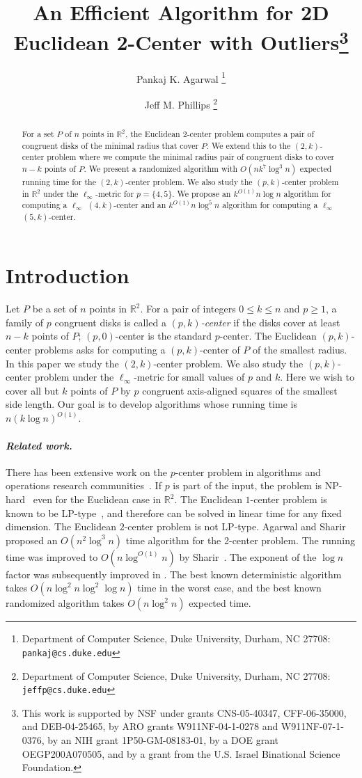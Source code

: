 \documentclass[11pt]{myclass}
\title{An Efficient Algorithm for 2D Euclidean 2-Center with Outliers\thanks{This work is supported by NSF under grants CNS-05-40347, CFF-06-35000, and DEB-04-25465, by ARO grants W911NF-04-1-0278 and W911NF-07-1-0376, by an NIH grant 1P50-GM-08183-01, by a DOE grant OEGP200A070505, and by a grant from the U.S. Israel Binational Science Foundation.}}
\author{Pankaj K. Agarwal
\thanks{Department of Computer Science, Duke University, Durham, NC 27708: \texttt{pankaj@cs.duke.edu}} 
\and Jeff M. Phillips
\thanks{Department of Computer Science, Duke University, Durham, NC 27708: \texttt{jeffp@cs.duke.edu}}
}
\renewcommand{\b}[1]{\ensuremath{\mathbb{#1}}}
\begin{document}
\maketitle

\begin{abstract}
For a set $P$ of $n$ points in $\b{R}^2$, the Euclidean $2$-center problem computes a pair of congruent disks of the minimal radius that cover $P$.  We extend this to the $(2,k)$-center problem where we compute the minimal radius pair of congruent disks to cover $n-k$ points of $P$.  
We present a randomized algorithm with $O(n k^7 \log^3 n)$ expected running time for the $(2,k)$-center problem.  
We also study the $(p,k)$-center problem in $\b{R}^2$ under the $\ell_\infty$-metric for $p=\{4,5\}$. 
We propose an $k^{O(1)} n\log n$ algorithm for computing a $\ell_\infty$ $(4,k)$-center and an $k^{O(1)} n \log^5 n$ algorithm for computing a $\ell_\infty$ $(5,k)$-center. 
\end{abstract}

\section{Introduction}
Let $P$ be a set of $n$ points in $\b{R}^2$.  For a pair of integers $0\leq k \leq n$ and $p \geq 1$, a family of $p$ congruent disks is called a \emph{$(p,k)$-center} if the disks cover at least $n-k$ points of $P$; $(p,0)$-center is the standard $p$-center.  The Euclidean $(p,k)$-center problems asks for computing a $(p,k)$-center of $P$ of the smallest radius.  In this paper we study the $(2,k)$-center problem.
We also study the $(p,k)$-center problem under the $\ell_\infty$-metric for small values of $p$ and $k$.  Here we wish to cover all but $k$ points of $P$ by $p$ congruent axis-aligned squares of the smallest side length.  Our goal is to develop algorithms whose running time is $n (k \log n)^{O(1)}$.


\paragraph{\textbf{\emph{Related work.}}}
There has been extensive work on the $p$-center problem in algorithms and operations research communities~\cite{AS98,DH02,Hoch95,CKMN01}.  
If $p$ is part of the input, the problem is NP-hard~\cite{MS84} even for the Euclidean case in $\b{R}^2$.  The Euclidean $1$-center problem is known to be LP-type~\cite{MSW96}, and therefore can be solved in linear time for any fixed dimension.  
The Euclidean $2$-center problem is not LP-type.  Agarwal and Sharir~\cite{AS94} proposed an $O(n^2 \log^3 n)$ time algorithm for the 2-center problem.  The running time was improved to $O(n \log^{O(1)} n)$ by Sharir~\cite{Sha97}.  The exponent of the $\log n$ factor was subsequently improved in \cite{Epp97,Chan99}.  The best known deterministic algorithm takes $O(n \log^2 n \log^2 \log n)$ time in the worst case, and the best known randomized algorithm takes $O(n \log^2 n)$ expected time.  
\end{document}
